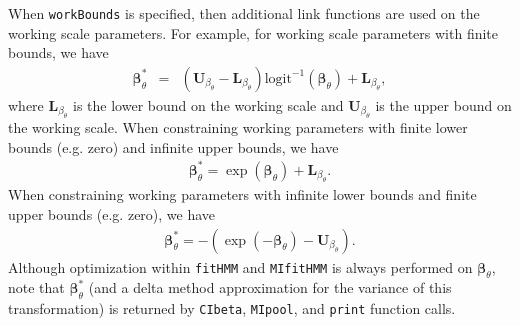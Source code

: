 \documentclass[12pt]{article}\usepackage[]{graphicx}\usepackage[]{xcolor}
\begin{document}
When \verb|workBounds| is specified, then additional link functions are used on the working scale parameters.  For example, for working scale parameters with finite bounds, we have
\begin{eqnarray*}
{\boldsymbol \beta}_\theta^* &=&  \left({\mathbf U}_{\beta_\theta} - {\mathbf L}_{\beta_\theta} \right) \text{logit}^{-1} \left( {\boldsymbol \beta}_\theta \right) + {\mathbf L}_{\beta_\theta},
\end{eqnarray*}
where ${\mathbf L}_{\beta_\theta}$ is the lower bound on the working scale and ${\mathbf U}_{\beta_\theta}$ is the upper bound on the working scale. When constraining working parameters with finite lower bounds (e.g. zero) and infinite upper bounds, we have
\begin{eqnarray*}
{\boldsymbol \beta}_\theta^* =  \exp \left( {\boldsymbol \beta}_\theta \right) + {\mathbf L}_{\beta_\theta}.
\end{eqnarray*}
When constraining working parameters with infinite lower bounds and finite upper bounds (e.g. zero), we have
\begin{eqnarray*}
{\boldsymbol \beta}_\theta^* =  - \left( \exp \left( -{\boldsymbol \beta}_\theta \right) - {\mathbf U}_{\beta_\theta} \right).
\end{eqnarray*}
Although optimization within \verb|fitHMM| and \verb|MIfitHMM| is always performed on ${\boldsymbol \beta}_\theta$, note that ${\boldsymbol \beta}_\theta^*$ (and a delta method approximation for the variance of this transformation) is returned by \verb|CIbeta|, \verb|MIpool|, and \verb|print| function calls.  
\end{document}
